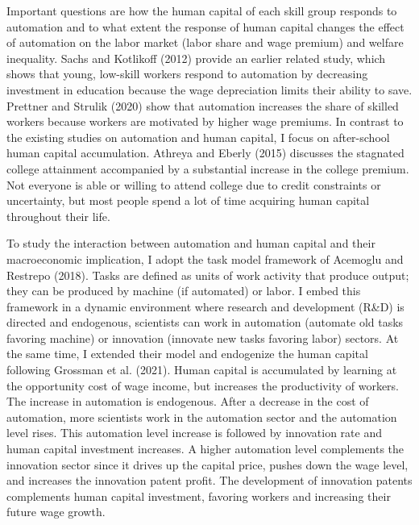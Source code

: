 \documentclass[12pt]{article}
\begin{document}
Important questions are how the human capital of each skill group responds to automation and to what extent the response of human capital changes the effect of automation on the labor market (labor share and wage premium) and welfare inequality. Sachs and Kotlikoff (2012)\nocite{SachsKotlikoff2012} provide an earlier related study, which shows that young, low-skill workers respond to automation by decreasing investment in education because the wage depreciation limits their ability to save. Prettner and Strulik (2020)\nocite{PrettnerStrulik2020} show that automation increases the share of skilled workers because workers are motivated by higher wage premiums. In contrast to the existing studies on automation and human capital, I focus on after-school human capital accumulation. Athreya and Eberly (2015)\nocite{AthreyaEberly2015} discusses the stagnated college attainment accompanied by a substantial increase in the college premium. Not everyone is able or willing to attend college due to credit constraints or uncertainty, but most people spend a lot of time acquiring human capital throughout their life.

To study the interaction between automation and human capital and their macroeconomic implication, I adopt the task model framework of Acemoglu and Restrepo (2018)\nocite{AcemogluRestrepo2018}. Tasks are defined as units of work activity that produce output; they can be produced by machine (if automated) or labor. I embed this framework in a dynamic environment where research and development (R\&D) is directed and endogenous, scientists can work in automation (automate old tasks favoring machine) or innovation (innovate new tasks favoring labor) sectors. At the same time, I extended their model and endogenize the human capital following Grossman et al. (2021)\nocite{Grossmanetal2021}. Human capital is accumulated by learning at the opportunity cost of wage income, but increases the productivity of workers. The increase in automation is endogenous. After a decrease in the cost of automation, more scientists work in the automation sector and the automation level rises. This automation level increase is followed by innovation rate and human capital investment increases. A higher automation level complements the innovation sector since it drives up the capital price, pushes down the wage level, and increases the innovation patent profit. The development of innovation patents complements human capital investment, favoring workers and increasing their future wage growth. 
\end{document}
